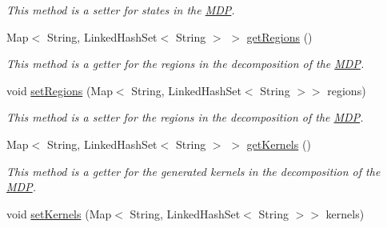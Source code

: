 \begin{DoxyCompactItemize}
\begin{DoxyCompactList}\small\item\em This method is a setter for states in the \hyperlink{classese_1_1seas_1_1upenn_1_1edu_1_1_m_d_p}{M\+D\+P}. \end{DoxyCompactList}\item 
\hypertarget{classese_1_1seas_1_1upenn_1_1edu_1_1_m_d_p_a6b9a6199604bc5d63083d0b35b5c1bd5}{}Map$<$ String, Linked\+Hash\+Set$<$ String $>$ $>$ \hyperlink{classese_1_1seas_1_1upenn_1_1edu_1_1_m_d_p_a6b9a6199604bc5d63083d0b35b5c1bd5}{get\+Regions} ()\label{classese_1_1seas_1_1upenn_1_1edu_1_1_m_d_p_a6b9a6199604bc5d63083d0b35b5c1bd5}

\begin{DoxyCompactList}\small\item\em This method is a getter for the regions in the decomposition of the \hyperlink{classese_1_1seas_1_1upenn_1_1edu_1_1_m_d_p}{M\+D\+P}. \end{DoxyCompactList}\item 
\hypertarget{classese_1_1seas_1_1upenn_1_1edu_1_1_m_d_p_a38e59bfc73d139a836ec0f290d2972ac}{}void \hyperlink{classese_1_1seas_1_1upenn_1_1edu_1_1_m_d_p_a38e59bfc73d139a836ec0f290d2972ac}{set\+Regions} (Map$<$ String, Linked\+Hash\+Set$<$ String $>$$>$ regions)\label{classese_1_1seas_1_1upenn_1_1edu_1_1_m_d_p_a38e59bfc73d139a836ec0f290d2972ac}

\begin{DoxyCompactList}\small\item\em This method is a setter for the regions in the decomposition of the \hyperlink{classese_1_1seas_1_1upenn_1_1edu_1_1_m_d_p}{M\+D\+P}. \end{DoxyCompactList}\item 
\hypertarget{classese_1_1seas_1_1upenn_1_1edu_1_1_m_d_p_a1d6bad6b1b89f769ba4b70e6785b552b}{}Map$<$ String, Linked\+Hash\+Set$<$ String $>$ $>$ \hyperlink{classese_1_1seas_1_1upenn_1_1edu_1_1_m_d_p_a1d6bad6b1b89f769ba4b70e6785b552b}{get\+Kernels} ()\label{classese_1_1seas_1_1upenn_1_1edu_1_1_m_d_p_a1d6bad6b1b89f769ba4b70e6785b552b}

\begin{DoxyCompactList}\small\item\em This method is a getter for the generated kernels in the decomposition of the \hyperlink{classese_1_1seas_1_1upenn_1_1edu_1_1_m_d_p}{M\+D\+P}. \end{DoxyCompactList}\item 
\hypertarget{classese_1_1seas_1_1upenn_1_1edu_1_1_m_d_p_a9c2e3123d4e47d60f769cec148c91f57}{}void \hyperlink{classese_1_1seas_1_1upenn_1_1edu_1_1_m_d_p_a9c2e3123d4e47d60f769cec148c91f57}{set\+Kernels} (Map$<$ String, Linked\+Hash\+Set$<$ String $>$$>$ kernels)\label{classese_1_1seas_1_1upenn_1_1edu_1_1_m_d_p_a9c2e3123d4e47d60f769cec148c91f57}


\end{DoxyCompactItemize}
